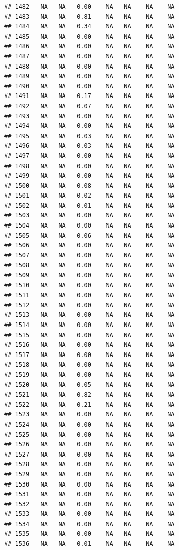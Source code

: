 \documentclass{article}\usepackage{graphicx, color}
\makeatletter
\newenvironment{kframe}{%
 \def\at@end@of@kframe{}%
 \ifinner\ifhmode%
  \def\at@end@of@kframe{\end{minipage}}%
  \begin{minipage}{\columnwidth}%
 \fi\fi%
 \def\FrameCommand##1{\hskip\@totalleftmargin \hskip-\fboxsep
 \colorbox{shadecolor}{##1}\hskip-\fboxsep
     \hskip-\linewidth \hskip-\@totalleftmargin \hskip\columnwidth}%
 \MakeFramed {\advance\hsize-\width
   \@totalleftmargin\z@ \linewidth\hsize
   \@setminipage}}%
 {\par\unskip\endMakeFramed%
 \at@end@of@kframe}
\newenvironment{knitrout}{}{} %
\makeatother
\begin{document}
\begin{knitrout}
\begin{kframe}
\begin{verbatim}
## 1482   NA   NA   0.00    NA   NA    NA    NA
## 1483   NA   NA   0.81    NA   NA    NA    NA
## 1484   NA   NA   0.34    NA   NA    NA    NA
## 1485   NA   NA   0.00    NA   NA    NA    NA
## 1486   NA   NA   0.00    NA   NA    NA    NA
## 1487   NA   NA   0.00    NA   NA    NA    NA
## 1488   NA   NA   0.00    NA   NA    NA    NA
## 1489   NA   NA   0.00    NA   NA    NA    NA
## 1490   NA   NA   0.00    NA   NA    NA    NA
## 1491   NA   NA   0.17    NA   NA    NA    NA
## 1492   NA   NA   0.07    NA   NA    NA    NA
## 1493   NA   NA   0.00    NA   NA    NA    NA
## 1494   NA   NA   0.00    NA   NA    NA    NA
## 1495   NA   NA   0.03    NA   NA    NA    NA
## 1496   NA   NA   0.03    NA   NA    NA    NA
## 1497   NA   NA   0.00    NA   NA    NA    NA
## 1498   NA   NA   0.00    NA   NA    NA    NA
## 1499   NA   NA   0.00    NA   NA    NA    NA
## 1500   NA   NA   0.08    NA   NA    NA    NA
## 1501   NA   NA   0.02    NA   NA    NA    NA
## 1502   NA   NA   0.01    NA   NA    NA    NA
## 1503   NA   NA   0.00    NA   NA    NA    NA
## 1504   NA   NA   0.00    NA   NA    NA    NA
## 1505   NA   NA   0.06    NA   NA    NA    NA
## 1506   NA   NA   0.00    NA   NA    NA    NA
## 1507   NA   NA   0.00    NA   NA    NA    NA
## 1508   NA   NA   0.00    NA   NA    NA    NA
## 1509   NA   NA   0.00    NA   NA    NA    NA
## 1510   NA   NA   0.00    NA   NA    NA    NA
## 1511   NA   NA   0.00    NA   NA    NA    NA
## 1512   NA   NA   0.00    NA   NA    NA    NA
## 1513   NA   NA   0.00    NA   NA    NA    NA
## 1514   NA   NA   0.00    NA   NA    NA    NA
## 1515   NA   NA   0.00    NA   NA    NA    NA
## 1516   NA   NA   0.00    NA   NA    NA    NA
## 1517   NA   NA   0.00    NA   NA    NA    NA
## 1518   NA   NA   0.00    NA   NA    NA    NA
## 1519   NA   NA   0.00    NA   NA    NA    NA
## 1520   NA   NA   0.05    NA   NA    NA    NA
## 1521   NA   NA   0.82    NA   NA    NA    NA
## 1522   NA   NA   0.21    NA   NA    NA    NA
## 1523   NA   NA   0.00    NA   NA    NA    NA
## 1524   NA   NA   0.00    NA   NA    NA    NA
## 1525   NA   NA   0.00    NA   NA    NA    NA
## 1526   NA   NA   0.00    NA   NA    NA    NA
## 1527   NA   NA   0.00    NA   NA    NA    NA
## 1528   NA   NA   0.00    NA   NA    NA    NA
## 1529   NA   NA   0.00    NA   NA    NA    NA
## 1530   NA   NA   0.00    NA   NA    NA    NA
## 1531   NA   NA   0.00    NA   NA    NA    NA
## 1532   NA   NA   0.00    NA   NA    NA    NA
## 1533   NA   NA   0.00    NA   NA    NA    NA
## 1534   NA   NA   0.00    NA   NA    NA    NA
## 1535   NA   NA   0.00    NA   NA    NA    NA
## 1536   NA   NA   0.01    NA   NA    NA    NA

\end{verbatim}
\end{kframe}
\end{knitrout}
\end{document}
